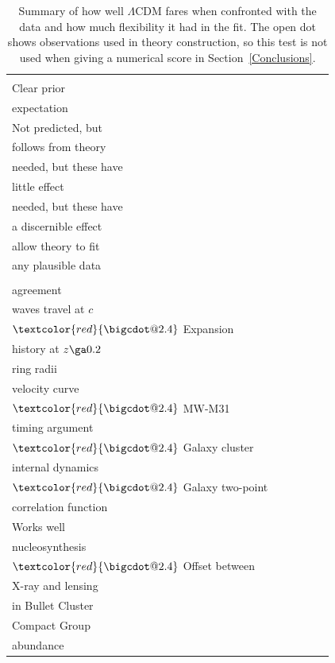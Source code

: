\documentclass[fleqn,usenatbib,useAMS]{mnras} %
\makeatletter
\DeclareRobustCommand*\bigcdot{\mathpalette\bigcdot@{2.4}}
\DeclareRobustCommand*\bigcdot@[2]{\mathbin{\vcenter{\hbox{\scalebox{#2}{$\m@th#1\bullet$}}}}}
\makeatother
\begin{document}
\begin{table}
	\centering
	\caption{Summary of how well $\Lambda$CDM fares when confronted with the data and how much flexibility it had in the fit. The open dot shows observations used in theory construction, so this test is not used when giving a numerical score in Section~\ref{Conclusions}.}
	\begin{tabular}{llllll}
		\hline
		\makecell{} & \makecell{\\ Clear prior \\ expectation} & \makecell{\\ Not predicted, but \\ follows from theory} & \makecell{Auxiliary assumptions \\ needed, but these have \\ little effect} & \makecell{Auxiliary assumptions \\ needed, but these have \\ a discernible effect} & \makecell{Auxiliary assumptions \\ allow theory to fit \\ any plausible data} \\ \hline
		\makecell{Excellent \\ agreement} & \makecell{$\textcolor{red}{\bigcdot}$ Gravitational \\ waves travel at $c$ \\ $\textcolor{red}{\bigcdot}$ Expansion \\ history at $z \ga 0.2$} & \makecell{$\textcolor{red}{\bigcdot}$ Einstein \\ ring radii} & \makecell{} & \makecell{$\textcolor{red}{\bigodot}$ CMB anisotropies} & \makecell{$\textcolor{red}{\bigcdot}$ MW escape \\ velocity curve \\ $\textcolor{red}{\bigcdot}$ MW-M31 \\ timing argument \\ $\textcolor{red}{\bigcdot}$ Galaxy cluster \\ internal dynamics \\ $\textcolor{red}{\bigcdot}$ Galaxy two-point \\ correlation function} \\ \hline
		Works well & \makecell{$\textcolor{red}{\bigcdot}$ Big Bang \\ nucleosynthesis \\ $\textcolor{red}{\bigcdot}$ Offset between \\ X-ray and lensing \\ in Bullet Cluster} & \makecell{} & \makecell{} & \makecell{$\textcolor{red}{\bigcdot}$ Hickson \\ Compact Group \\ abundance} & \makecell{} \\ \hline

\end{tabular}
\end{table}
\end{document}
